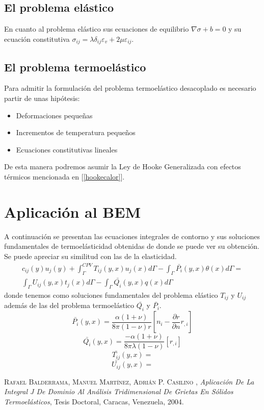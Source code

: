 \documentclass[11pt,a4paper]{article}
\begin{document}
\subsection{El problema elástico}
En cuanto al problema elástico sus ecuaciones de equilibrio $\nabla \sigma +b =0$ y su ecuación constitutiva $\sigma_{ij}=\lambda \delta_{ij} \varepsilon_{v} + 2 \mu \varepsilon_{ij}$.
\subsection{El problema termoelástico}
Para admitir la formulación del problema termoelástico desacoplado es necesario partir de unas hipótesis: \begin{itemize}
\item Deformaciones pequeñas
\item Incrementos de temperatura pequeños
\item Ecuaciones constitutivas lineales
\end{itemize}
De esta manera podremos asumir la Ley de Hooke Generalizada con efectos térmicos mencionada en [\ref{hookecalor}].
\section{Aplicación al BEM}
A continuación se presentan las ecuaciones integrales de contorno y sus soluciones fundamentales de termoelásticidad obtenidas de \cite{Bal} donde se puede ver su obtención. Se puede apreciar su similitud con las de la elasticidad.
\begin{equation}
\begin{aligned}
c_{ij}(y)u_{j}(y)+\int_{\Gamma}^{CPV} T_{ij}(y,x)u_{j}(x) d \Gamma - \int_{\Gamma} \bar{P_{i}}(y,x)\theta(x) d\Gamma = \\ \int_{\Gamma} U_{ij}(y,x)t_{j}(x) d\Gamma -\int_{\Gamma} \bar{Q_{i}}(y,x)q(x)d\Gamma
\end{aligned}
\end{equation}
donde tenemos como soluciones fundamentales del problema elástico $T_{ij}$ y $U_{ij}$ además de las del problema termoelástico $\bar{Q_{i}}$ y $ \bar{P_{i}}$.
\vspace{0.5cm}
\begin{equation}
\bar{P_{i}}(y,x)=\frac{\alpha(1+\nu)}{8\pi(1-\nu)r}[n_i-\frac{\partial{r}}{\partial{n}}r_{,i}]
\end{equation}
\begin{equation}
\bar{Q_{i}}(y,x)=\frac{-\alpha(1+\nu)}{8\pi\lambda(1-\nu)}[r_{,i}]
\end{equation}
\begin{equation}
\bar{T_{ij}}(y,x)=
\end{equation}
\begin{equation}
\bar{U_{ij}}(y,x)=
\end{equation}

\begin{thebibliography}{X}
 \textsc{Rafael Balderrama, Manuel Mart{\'\i}nez, Adri{\'a}n P. Casilino },
\textit{Aplicaci{\'o}n De La Integral J De Dominio Al An{\'a}lisis Tridimensional De Grietas En S{\'o}lidos Termoel{\'a}sticos}, Tesis Doctoral,
Caracas, Venezuela, 2004.
\end{thebibliography}
\end{document}
